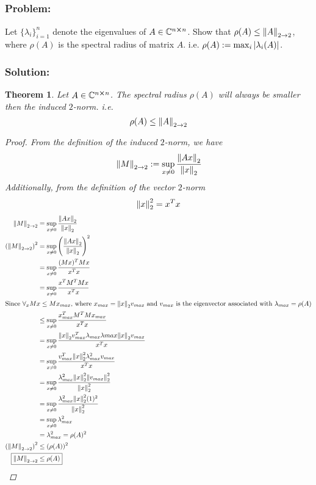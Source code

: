 \documentclass[letter]{article}
\numberwithin{equation}{section}
\newcommand{\C}{\mathbb{C}}
\newtheorem{theorem}{Theorem}
\begin{document}
\subsection{}
\subsubsection*{Problem:}
Let $\{\lambda_i\}_{i=1}^{n}$ denote the eigenvalues of $A\in \C^{n\cross n}$.
Show that $\rho(A) \leq \norm{A}_{2\to 2}$, where $\rho(A)$ is the spectral radius of matrix $A$.
i.e. $\rho(A) := \max_{i} \abs{\lambda_i(A)}$.

\subsubsection*{Solution:}
\begin{theorem}
    Let $A \in \C^{n\cross n}$.
    The spectral radius $\rho(A)$ will always be smaller then the induced $2$-norm.
    i.e.\[
        \rho(A) \leq \norm{A}_{2\to 2}
    \]
    \begin{proof}
        From the definition of the induced $2$-norm, we have\[
            \norm{M}_{2\to2} := \sup_{x \neq 0} \cfrac{\norm{A x}_2}{\norm{x}_2}
        \] Additionally, from the definition of the vector $2$-norm \[
            \norm{x}_{2}^{2} = x^T x
        \]
        \begin{align*}
            \norm{M}_{2\to2} 
                &= \sup_{x \neq 0} \cfrac{\norm{A x}_2}{\norm{x}_2}\\
            \qty(\norm{M}_{2\to2})^2 
                &= \sup_{x \neq 0} \qty(\cfrac{\norm{A x}_2}{\norm{x}_2})^2\\
                &= \sup_{x \neq 0} \cfrac{(Mx)^T M x}{x^T x}\\
                &= \sup_{x \neq 0} \cfrac{x^T M^T M x}{x^T x}\\
            \intertext{Since $\forall_{x} M x \leq M x_{max}$, where $x_{max}= \norm{x}_2 v_{max}$ and $v_{max}$ is the eigenvector associated with $\lambda_{max} = \rho(A)$}
                &\leq \sup_{x \neq 0} \cfrac{x_{max}^T M^T M x_{max}}{x^T x}\\
                &= \sup_{x \neq 0} \cfrac{\norm{x}_2 v_{max}^T \lambda_{max} \lambda{max} \norm{x}_2 v_{max}}{x^T x}\\
                &= \sup_{x \neq 0} \cfrac{v_{max}^T \norm{x}_2^2 \lambda_{max}^2 v_{max}}{x^T x}\\
                &= \sup_{x \neq 0} \cfrac{\lambda_{max}^2 \norm{x}_2^2 \norm{v_{max}}_2^2}{\norm{x}_2^2}\\
                &= \sup_{x \neq 0} \cfrac{\lambda_{max}^2 \norm{x}_2^2 (1)^2}{\norm{x}_2^2}\\
                &= \sup_{x \neq 0} \lambda_{max}^2\\
                &= \lambda_{max}^2 = \rho(A)^2\\
            \qty(\norm{M}_{2\to2})^2 
                &\leq (\rho(A))^2\\
            \Aboxed{
                \norm{M}_{2\to2} &\leq \rho(A)
            }
        \end{align*}
    \end{proof}
\end{theorem}
\end{document}
